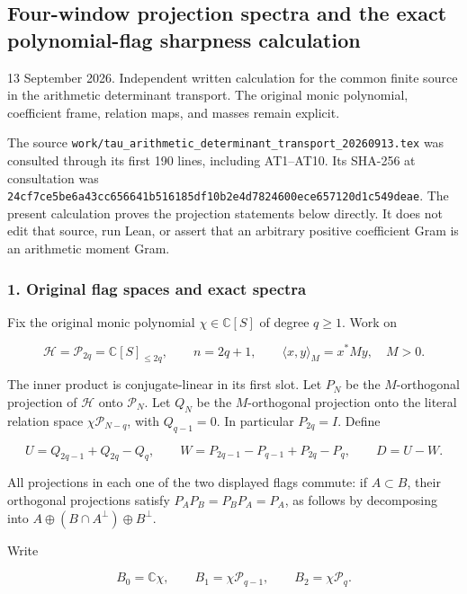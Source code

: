 \subsection{Four-window projection spectra and the exact polynomial-flag sharpness calculation}\label{endpoint-four_window_sharpness--four-window-projection-spectra-and-the-exact-polynomial-flag-sharpness-calculation}

13 September 2026. Independent written calculation for the common finite source in the arithmetic determinant transport. The original monic polynomial, coefficient frame, relation maps, and masses remain explicit.

The source \nolinkurl{work/tau_arithmetic_determinant_transport_20260913.tex} was consulted through its first 190 lines, including AT1--AT10. Its SHA-256 at consultation was \nolinkurl{24cf7ce5be6a43cc656641b516185df10b2e4d7824600ece657120d1c549deae}. The present calculation proves the projection statements below directly. It does not edit that source, run Lean, or assert that an arbitrary positive coefficient Gram is an arithmetic moment Gram.

\subsubsection{1. Original flag spaces and exact spectra}\label{endpoint-four_window_sharpness--original-flag-spaces-and-exact-spectra}

Fix the original monic polynomial \(\chi\in\mathbb C[S]\) of degree \(q\ge1\). Work on

\[
\mathcal H=\mathcal P_{2q}=\mathbb C[S]_{\le2q},\qquad n=2q+1,
\qquad \langle x,y\rangle_M=x^*My,
\quad M>0.
\tag{FS1}
\]

The inner product is conjugate-linear in its first slot. Let \(P_N\) be the \(M\)-orthogonal projection of \(\mathcal H\) onto \(\mathcal P_N\). Let \(Q_N\) be the \(M\)-orthogonal projection onto the literal relation space \(\chi\mathcal P_{N-q}\), with \(Q_{q-1}=0\). In particular \(P_{2q}=I\). Define

\[
U=Q_{2q-1}+Q_{2q}-Q_q,
\qquad
W=P_{2q-1}-P_{q-1}+P_{2q}-P_q,
\qquad D=U-W.
\tag{FS2}
\]

All projections in each one of the two displayed flags commute: if \(A\subset B\), their orthogonal projections satisfy \(P_AP_B=P_BP_A=P_A\), as follows by decomposing into \(A\oplus(B\cap A^\perp)\oplus B^\perp\).

Write

\[
B_0=\mathbb C\chi,\qquad
B_1=\chi\mathcal P_{q-1},\qquad
B_2=\chi\mathcal P_q.
\tag{FS3}
\]

